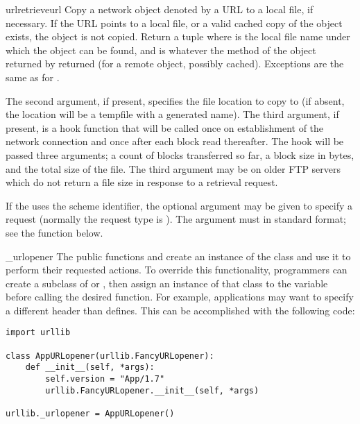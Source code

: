 \begin{funcdesc}{urlretrieve}{url}
Copy a network object denoted by a URL to a local file, if necessary.
If the URL points to a local file, or a valid cached copy of the
object exists, the object is not copied.  Return a tuple
 where  is the
local file name under which the object can be found, and 
is whatever the  method of the object returned by
 returned (for a remote object, possibly cached).
Exceptions are the same as for .

The second argument, if present, specifies the file location to copy
to (if absent, the location will be a tempfile with a generated name).
The third argument, if present, is a hook function that will be called
once on establishment of the network connection and once after each
block read thereafter.  The hook will be passed three arguments; a
count of blocks transferred so far, a block size in bytes, and the
total size of the file.  The third argument may be  on older
FTP servers which do not return a file size in response to a retrieval
request.

If the  uses the  scheme identifier, the optional
 argument may be given to specify a  request
(normally the request type is ).  The  argument
must in standard  format;
see the  function below.
\end{funcdesc}

\begin{datadesc}{_urlopener}
The public functions  and
 create an instance of the
 class and use it to perform their requested
actions.  To override this functionality, programmers can create a
subclass of  or , then assign
an instance of that class to the
 variable before calling the desired function.
For example, applications may want to specify a different
 header than  defines.  This
can be accomplished with the following code:

\begin{verbatim}
import urllib

class AppURLopener(urllib.FancyURLopener):
    def __init__(self, *args):
        self.version = "App/1.7"
        urllib.FancyURLopener.__init__(self, *args)

urllib._urlopener = AppURLopener()
\end{verbatim}
\end{datadesc}

